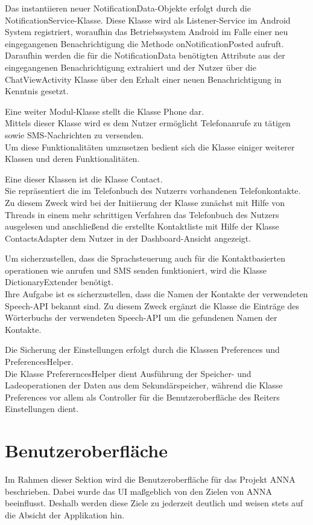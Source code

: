 Das instantiieren neuer NotificationData-Objekte erfolgt durch die NotificationService-Klasse.
Diese Klasse wird als Listener-Service im Android System registriert, woraufhin das Betriebssystem Android im Falle einer neu eingegangenen Benachrichtigung die Methode onNotificationPosted aufruft. Daraufhin werden die für die NotificationData benötigten Attribute aus der eingegangenen Benachrichtigung extrahiert und der Nutzer über die ChatViewActivity Klasse über den Erhalt einer neuen Benachrichtigung in Kenntnis gesetzt.

Eine weiter Modul-Klasse stellt die Klasse Phone dar.\\
Mittels dieser Klasse wird es dem Nutzer ermöglicht Telefonanrufe zu tätigen sowie SMS-Nachrichten zu versenden.\\
Um diese Funktionalitäten umzusetzen bedient sich die Klasse einiger weiterer Klassen und deren Funktionalitäten.

Eine dieser Klassen ist die Klasse Contact.\\
Sie repräsentiert die im Telefonbuch des Nutzerrs vorhandenen Telefonkontakte. Zu diesem Zweck wird bei der Initiierung der Klasse zunächst mit Hilfe von Threads in einem mehr schrittigen Verfahren das Telefonbuch des Nutzers ausgelesen und anschließend die erstellte Kontaktliste mit Hilfe der Klasse ContactsAdapter dem Nutzer in der Dashboard-Ansicht angezeigt.

Um sicherzustellen, dass die Sprachsteuerung auch für die Kontaktbasierten operationen wie anrufen und SMS senden funktioniert, wird die Klasse DictionaryExtender benötigt.\\
Ihre Aufgabe ist es sicherzustellen, dass die Namen der Kontakte der verwendeten Speech-API bekannt sind. Zu diesem Zweck ergänzt die Klasse die Einträge des Wörterbuchs der verwendeten Speech-API um die gefundenen Namen der Kontakte.

Die Sicherung der Einstellungen erfolgt durch die Klassen Preferences und PreferencesHelper.\\
Die Klasse PrefererncesHelper dient Ausführung der Speicher- und Ladeoperationen der Daten aus dem Sekundärspeicher, während die Klasse Preferences vor allem als Controller für die Benutzeroberfläche des Reiters Einstellungen dient.

\section{Benutzeroberfläche}
Im Rahmen dieser Sektion wird die Benutzeroberfläche für das Projekt \ac{ANNA} beschrieben. Dabei wurde das \ac{UI} maßgeblich von den Zielen von \ac{ANNA} beeinflusst. Deshalb werden diese Ziele zu jederzeit deutlich und weisen stets auf die Absicht der Applikation hin. 

